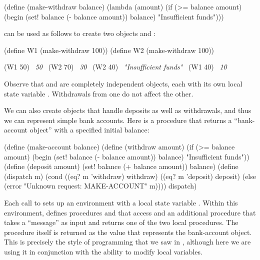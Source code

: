 \begin{codeBlock}
(define (make-withdraw balance)
  (lambda (amount)
    (if (>= balance amount)
        (begin (set! balance (- balance amount))
               balance)
        "Insufficient funds")))
\end{codeBlock}

\noindent
{} can be used as follows to create two objects  and
:

\begin{codeBlock}
(define W1 (make-withdraw 100))
(define W2 (make-withdraw 100))

(W1 50)
~\textit{50}~
(W2 70)
~\textit{30}~
(W2 40)
~\textit{"Insufficient funds"}~
(W1 40)
~\textit{10}~
\end{codeBlock}

\noindent
Observe that  and  are completely independent objects, each
with its own local state variable .  Withdrawals from one do not
affect the other.

We can also create objects that handle deposits as well as withdrawals, and
thus we can represent simple bank accounts.  Here is a procedure that returns a
``bank-account object'' with a specified initial balance:

\begin{codeBlock}
(define (make-account balance)
  (define (withdraw amount)
    (if (>= balance amount)
        (begin (set! balance (- balance amount))
               balance)
        "Insufficient funds"))
  (define (deposit amount)
    (set! balance (+ balance amount))
    balance)
  (define (dispatch m)
    (cond ((eq? m 'withdraw) withdraw)
          ((eq? m 'deposit) deposit)
          (else (error "Unknown request: MAKE-ACCOUNT"
                       m))))
  dispatch)
\end{codeBlock}

\noindent
Each call to  sets up an environment with a local state
variable .  Within this environment,  defines
procedures  and  that access  and an
additional procedure  that takes a ``message'' as input and
returns one of the two local procedures.  The  procedure itself
is returned as the value that represents the bank-account object.  This is
precisely the  style of programming that we saw in
, although here we are using it in conjunction with the
ability to modify local variables.


